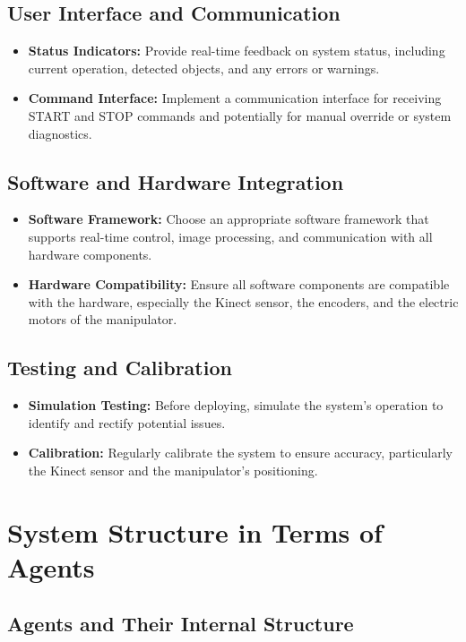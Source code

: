 \documentclass[12pt]{report}
\begin{document}
\section{User Interface and Communication}
\begin{itemize}
    \item \textbf{Status Indicators:} Provide real-time feedback on system status, including current operation, detected objects, and any errors or warnings.
    \item \textbf{Command Interface:} Implement a communication interface for receiving START and STOP commands and potentially for manual override or system diagnostics.
\end{itemize}

\section{Software and Hardware Integration}
\begin{itemize}
    \item \textbf{Software Framework:} Choose an appropriate software framework that supports real-time control, image processing, and communication with all hardware components.
    \item \textbf{Hardware Compatibility:} Ensure all software components are compatible with the hardware, especially the Kinect sensor, the encoders, and the electric motors of the manipulator.
\end{itemize}

\section{Testing and Calibration}
\begin{itemize}
    \item \textbf{Simulation Testing:} Before deploying, simulate the system's operation to identify and rectify potential issues.
    \item \textbf{Calibration:} Regularly calibrate the system to ensure accuracy, particularly the Kinect sensor and the manipulator’s positioning.
\end{itemize}

\chapter{System Structure in Terms of Agents}
\section{Agents and Their Internal Structure}
\end{document}
